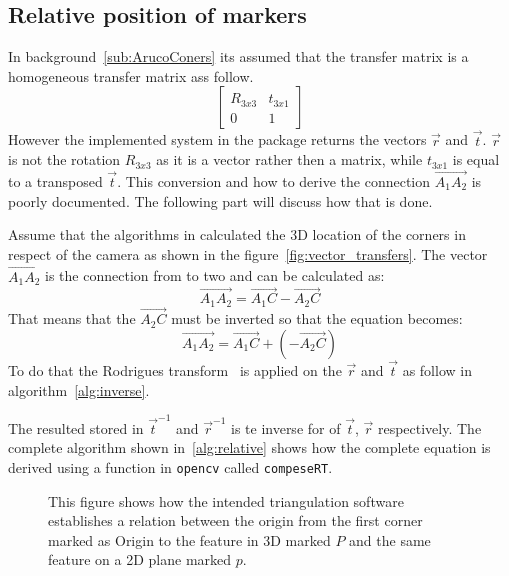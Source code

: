 \subsection{Relative position of \aruco markers}%
\label{sub:implement:relative}
In background~\ref{sub:ArucoConers} its assumed that the transfer matrix is a homogeneous transfer matrix ass follow.
\begin{equation}
    \begin{bmatrix}
        R_{3x3} & t_{3x1}\\
        0 & 1
    \end{bmatrix}
\end{equation}
However the implemented system in the \aruco{} package returns the vectors $\vec{r}$ and $\vec{t}$.
$\vec{r}$ is not the rotation $R_{3x3}$ as it is a vector rather then a matrix, while $t_{3x1}$ is equal to a transposed $\vec{t}$.
This conversion and how to derive the connection $\vec{A_1A_2}$ is poorly documented. The following part will discuss how that is done.
\par
Assume that the algorithms in \aruco calculated the 3D location of the corners in respect of the camera as shown in the  figure~\ref{fig:vector_transfers}.
The vector $\vec{A_1A_2}$ is the connection from  to \aruco two and can be calculated as:
\[
\vec{A_1A_2} = \vec{A_1C} - \vec{A_2C}
\]
That means that the $\vec{A_2C}$ must be inverted so that the equation becomes:
\[
\vec{A_1A_2} = \vec{A_1C} + (-\vec{A_2C})
\]
To do that the Rodrigues transform~\cite{rodriguez1840lois} is applied on the $\vec{r}$ and $\vec{t}$ as follow in algorithm~\ref{alg:inverse}.

The resulted stored in $\vec{t}^{-1}$ and $\vec{r}^{-1}$ is te inverse for of $\vec{t}$, $\vec{r}$ respectively.
The complete algorithm shown in~\ref{alg:relative} shows how the complete equation is derived using a function in \verb|opencv| called \verb|compeseRT|.
% 





\begin{figure}[ht]
    \begin{center}
        
    \end{center}
    \caption[Triangulations]{ This figure shows how the intended triangulation software establishes a relation between the origin from the first \aruco corner marked as Origin
        to the feature in 3D marked $P$ and the same feature on a 2D plane marked $p$.}
    \label{fig:camera_transfer}
\end{figure}


